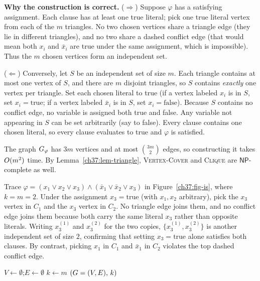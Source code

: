 \begin{whybox}
\textbf{Why the construction is correct.}
($\Rightarrow$) Suppose $\varphi$ has a satisfying assignment. Each clause has at least one true
literal; pick one true literal vertex from each of the $m$ triangles. No two chosen vertices share a triangle edge (they lie in different triangles), and no two share a dashed conflict edge (that would mean both $x_i$ and $\bar{x}_i$ are true under the same assignment, which is impossible). Thus the
$m$ chosen vertices form an independent set.

($\Leftarrow$) Conversely, let $S$ be an independent set of size $m$. Each triangle contains at
most one vertex of $S$, and there are $m$ disjoint triangles, so $S$ contains \emph{exactly}
one vertex per triangle. Set each chosen literal to true
(if a vertex labeled $x_i$ is in $S$, set $x_i=\text{true}$; if a vertex labeled $\bar{x}_i$ is in $S$, set
$x_i=\text{false}$). Because $S$ contains no conflict edge, no variable is assigned both
true and false. Any variable not appearing in $S$ can be set arbitrarily (say to false). Every clause contains one chosen literal,
so every clause evaluates to true and $\varphi$ is satisfied.
\end{whybox}

The graph $G_\varphi$ has $3m$ vertices and at most $\binom{3m}{2}$ edges, so constructing it takes
$O(m^2)$ time. By Lemma~\ref{ch37:lem-triangle},
\textsc{Vertex-Cover} and \textsc{Clique} are $\mathsf{NP}$-complete as well.

\begin{labbox}
Trace $\varphi=(x_1\vee x_2\vee x_3)\wedge(\bar{x}_1\vee\bar{x}_2\vee x_3)$
in Figure~\ref{ch37:fig-is}, where $k=m=2$. Under the assignment $x_3=\text{true}$ (with $x_1,x_2$ arbitrary), pick the $x_3$
vertex in $C_1$ and the $x_3$ vertex in $C_2$. No triangle edge joins them, and no
conflict edge joins them because both carry the same literal $x_3$ rather than opposite literals. Writing $x_3^{(1)}$ and $x_3^{(2)}$ for the two copies, $\{x_3^{(1)}, x_3^{(2)}\}$ is another independent set of size $2$, confirming that setting $x_3=\text{true}$ alone satisfies both clauses. By contrast, picking $x_1$ in $C_1$ and $\bar{x}_1$ in $C_2$ violates the top dashed conflict edge.
\end{labbox}

\begin{algorithm}[htbp]
\caption{\textsc{Reduce-3SAT-to-IndependentSet}$(\varphi)$}
\label{ch37:alg-is}
\DontPrintSemicolon
{}
$V\gets\emptyset$;\quad $E\gets\emptyset$\;
$k\gets m$\;
\Return $(G=(V,E),\,k)$\;
\end{algorithm}

